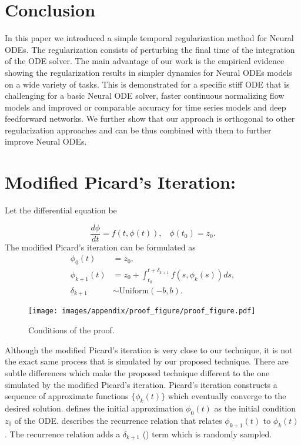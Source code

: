 \section{Conclusion}
In this paper we introduced a simple temporal regularization method for Neural ODEs. The regularization consists of perturbing the final time of the integration of the ODE solver. 
The main advantage of our work is the empirical evidence showing the regularization results in simpler dynamics for Neural ODEs models on a wide variety of tasks. This is demonstrated for a specific stiff ODE that is challenging for a basic Neural ODE solver, faster continuous normalizing flow models and improved or comparable accuracy for time series models and deep feedforward networks. We further show that our approach is orthogonal to other regularization approaches and can be thus combined with them to further improve Neural ODEs.

\section{Modified Picard's Iteration:}
Let the differential equation be

\begin{equation}
	\frac{d \phi }{dt} = f(t,\phi(t)) ,  \; \; \; \phi(t_0) = z_0.
\end{equation}
The modified Picard's iteration can be formulated as
\begin{subequations}
	\begin{align}
		\phi_0(t) &= z_0 , \label{eq:app_picard_1}\\ 
		\phi_{k+1}(t) &= z_0 + \int_{t_0}^{t + \delta_{k+1}}f(s,\phi_k(s)) ds, \label{eq:app_picard_2}\\
		\delta_{k+1} &\sim \text{Uniform}(-b,b) \label{eq:app_picard_3}.
	\end{align}
\end{subequations}


\begin{figure}[ht!]
	\centering  
	\texttt{[image: images/appendix/proof\_figure/proof\_figure.pdf]} 
	\caption{Conditions of the proof.}
	\label{fig:proof_viz}
\end{figure}

Although the modified Picard's iteration is very close to our technique, it is not the exact same process that is simulated by our proposed technique. There are subtle differences which make the proposed technique different to the one simulated by the modified Picard's iteration. Picard's iteration constructs a sequence of approximate functions $\{ \phi_k(t) \}$ which eventually converge to the desired solution.  defines the initial approximation $\phi_0(t)$ as the initial condition $z_0$ of the ODE.  describes the recurrence relation that relates $\phi_{k+1}(t)$ to $\phi_{k}(t)$. The recurrence relation adds a $\delta_{k+1}$ () term which is randomly sampled. 


